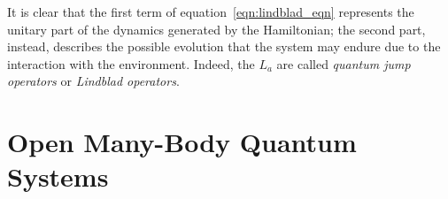It is clear that the first term of equation~\ref{eqn:lindblad_eqn} represents the unitary part of the dynamics generated by the Hamiltonian; the second part, instead, describes the possible evolution that the system may endure due to the interaction with the environment. Indeed, the $L_a$ are called \emph{quantum jump operators} or \emph{Lindblad operators}.



\section{Open Many-Body Quantum Systems}

